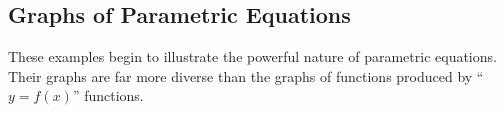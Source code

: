
%


\subsection*{Graphs of Parametric Equations}

These examples begin to illustrate the powerful nature of parametric equations. Their graphs are far more diverse than the graphs of functions produced by ``$y=f(x)$'' functions.


